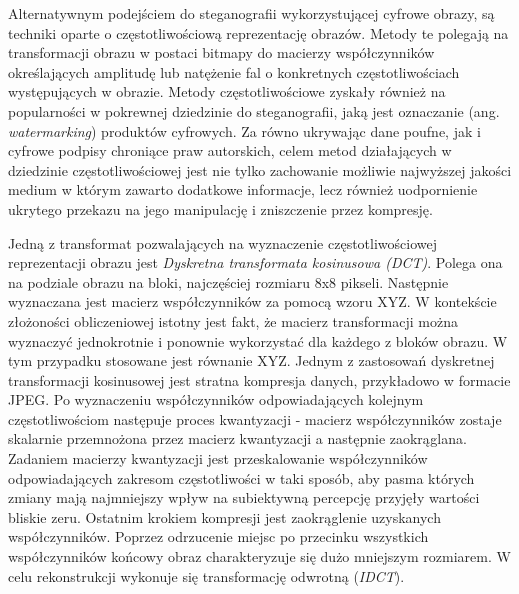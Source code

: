 {    %
    Alternatywnym podejściem do steganografii wykorzystującej cyfrowe obrazy, są techniki oparte o częstotliwościową reprezentację obrazów.
    Metody te polegają na transformacji obrazu w postaci bitmapy do macierzy współczynników określających amplitudę lub natężenie fal
    o konkretnych częstotliwościach występujących w obrazie.
    Metody częstotliwościowe zyskały również na popularności w pokrewnej dziedzinie do steganografii, jaką jest oznaczanie
    (ang. \textit{watermarking}) produktów cyfrowych. Za równo ukrywając dane poufne, jak i cyfrowe podpisy chroniące praw autorskich,
    celem metod działających w dziedzinie częstotliwościowej jest nie tylko zachowanie możliwie najwyższej jakości medium w którym
    zawarto dodatkowe informacje, lecz również uodpornienie ukrytego przekazu na jego manipulację i zniszczenie przez kompresję.

    Jedną z transformat pozwalających na wyznaczenie częstotliwościowej reprezentacji obrazu jest \textit{Dyskretna transformata kosinusowa (DCT)}.
    Polega ona na podziale obrazu na bloki, najczęściej rozmiaru 8x8 pikseli. Następnie wyznaczana jest macierz współczynników za pomocą wzoru XYZ. %
    W kontekście złożoności obliczeniowej istotny jest fakt, że macierz transformacji można wyznaczyć jednokrotnie i ponownie wykorzystać dla każdego
    z bloków obrazu. W tym przypadku stosowane jest równanie XYZ. %
    Jednym z zastosowań dyskretnej transformacji kosinusowej jest stratna kompresja danych, przykładowo w formacie JPEG.
    Po wyznaczeniu współczynników odpowiadających kolejnym częstotliwościom następuje proces kwantyzacji - macierz współczynników zostaje skalarnie przemnożona
    przez macierz kwantyzacji a następnie zaokrąglana. Zadaniem macierzy kwantyzacji jest przeskalowanie współczynników odpowiadających zakresom częstotliwości
    w taki sposób, aby pasma których zmiany mają najmniejszy wpływ na subiektywną percepcję przyjęły wartości bliskie zeru. Ostatnim krokiem kompresji jest
    zaokrąglenie uzyskanych współczynników. Poprzez odrzucenie miejsc po przecinku wszystkich współczynników końcowy obraz charakteryzuje się dużo
    mniejszym rozmiarem. W celu rekonstrukcji wykonuje się transformację odwrotną (\textit{IDCT}).

}

